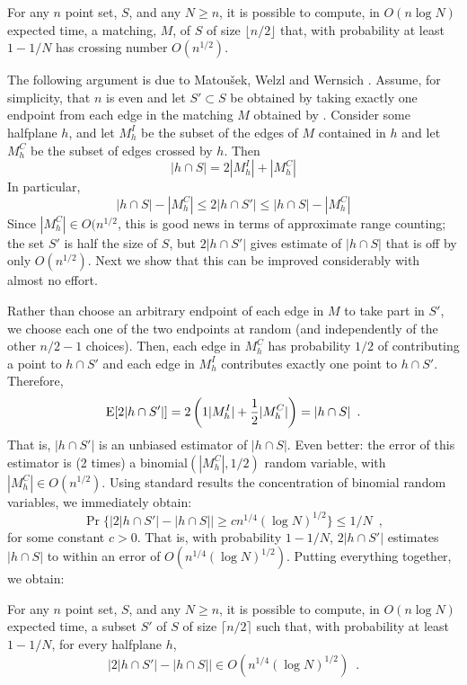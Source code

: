 \documentclass{cccg12}
\begin{document}
\begin{cor}
  For any $n$ point set, $S$, and any $N\ge n$, it is possible to
  compute, in $O(n\log N)$ expected time, a matching, $M$, of $S$ of
  size $\lfloor n/2\rfloor$ that, with probability at least $1-1/N$
  has crossing number $O(n^{1/2})$.
\end{cor}

The following argument is due to Matou\v{s}ek, Welzl and Wernsich
\cite[Lemma~2.5]{mww93}.  Assume, for simplicity, that $n$ is even and let
$S'\subset S$ be obtained by taking exactly one endpoint from each edge in
the matching $M$ obtained by .  Consider some halfplane
$h$,  and let $M^{I}_h$ be the subset of the edges of $M$ contained in
$h$ and let $M^{C}_h$ be the subset of edges crossed by $h$. Then
\[
     |h\cap S| = 2|M^{I}_h| + |M^{C}_h|
\] 
In particular,
\[
     |h\cap S|- |M^{C}_h| \le 2|h\cap S'| \le |h\cap S|- |M^{C}_h| 
\]
Since $|M^C_h|\in O(n^{1/2}$, this is good news in terms of approximate
range counting;  the set $S'$ is half the size of $S$, but $2|h\cap
S'|$ gives estimate of $|h\cap S|$ that is off by only $O(n^{1/2})$.
Next we show that this can be improved considerably with almost no effort.

Rather than choose an arbitrary endpoint of each edge in $M$ to
take part in $S'$, we choose each one of the two endpoints at random
(and independently of the other $n/2-1$ choices).  Then, each edge in
$M^{C}_h$ has probability $1/2$ of contributing a point to $h\cap S'$
and each edge in $M^{I}_h$ contributes exactly one point to $h\cap S'$.
Therefore,
\[
    \mathrm{E}[2|h\cap S'|]
      = 2\left(1|M^{I}_h| + \frac{1}{2}|M^{C}_h|\right) = |h\cap S| \enspace .
\]
That is, $|h\cap S'|$ is an unbiased estimator of $|h\cap
S|$.  Even better: the error of this estimator is (2 times) a
binomial$(|M^{C}_h|,1/2)$ random variable, with $|M^{C}_h|\in
O(n^{1/2})$.  Using standard results the concentration of binomial random
variables, we immediately obtain:
\[
   \Pr\{\left|2|h \cap S'| - |h\cap S|\right| \ge c n^{1/4}(\log N)^{1/2}\} 
       \le 1/N \enspace ,
\]
for some constant $c>0$.  That is, with probability $1-1/N$, $2|h\cap S'|$
estimates $|h\cap S|$ to within an error of $O(n^{1/4}(\log N)^{1/2})$.
Putting everything together, we obtain:

\begin{lem}
  For any $n$ point set, $S$, and any $N\ge n$, it is possible to
  compute, in $O(n\log N)$ expected time, a subset $S'$ of $S$ of 
  size $\lceil n/2\rceil$ such that, 
  with probability at least $1-1/N$, for every halfplane $h$,
  \[
     \left|2|h\cap S'| - |h\cap S|\right| \in O(n^{1/4}(\log N)^{1/2}) \enspace .
  \]
\end{lem}
\end{document}
